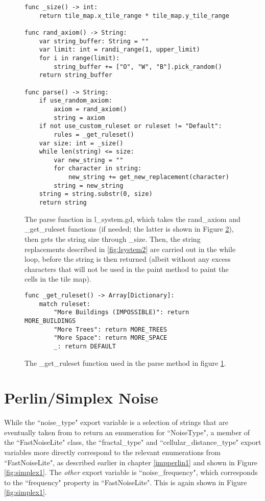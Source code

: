 \begin{figure}[H]
    \centering
    \begin{lstlisting}
func _size() -> int:
	return tile_map.x_tile_range * tile_map.y_tile_range

func rand_axiom() -> String:
	var string_buffer: String = ""
	var limit: int = randi_range(1, upper_limit)
	for i in range(limit):
		string_buffer += ["O", "W", "B"].pick_random()
	return string_buffer
 
func parse() -> String:
	if use_random_axiom:
		axiom = rand_axiom()
		string = axiom
	if not use_custom_ruleset or ruleset != "Default":
		rules = _get_ruleset()
	var size: int = _size()
	while len(string) <= size:
		var new_string = ""
		for character in string:
			new_string += get_new_replacement(character)
		string = new_string
	string = string.substr(0, size)
	return string
    \end{lstlisting}
    \caption{The parse function in l\_system.gd, which takes the rand\_axiom and \_get\_ruleset functions (if needed; the latter is shown in Figure \ref{fig:lsystem6}), then gets the string size through \_size. Then, the string replacements described in \ref{fig:lsystem2} are carried out in the while loop, before the string is then returned (albeit without any excess characters that will not be used in the paint method to paint the cells in the tile map).}
    \label{fig:lsystem5}
\end{figure}

\begin{figure}[H]
    \centering
    \begin{lstlisting}
func _get_ruleset() -> Array[Dictionary]:
	match ruleset:
		"More Buildings (IMPOSSIBLE)": return MORE_BUILDINGS
		"More Trees": return MORE_TREES
		"More Space": return MORE_SPACE
		_: return DEFAULT
    \end{lstlisting}
    \caption{The \_get\_ruleset function used in the parse method in figure \ref{fig:lsystem5}.}
    \label{fig:lsystem6}
\end{figure}

\section{Perlin/Simplex Noise} \label{impperlin2}

While the ``noise\_type" export variable is a selection of strings that are eventually taken from to return an enumeration for ``NoiseType", a member of the ``FastNoiseLite" class\cite{fastnoiselitedocs}, the ``fractal\_type" and ``cellular\_distance\_type" export variables more directly correspond to the relevant enumerations from ``FastNoiseLite", as described earlier in chapter \ref{impperlin1} and shown in Figure \ref{fig:simplex1}. The \textit{other} export variable is ``noise\_frequency", which corresponds to the ``frequency" property in ``FastNoiseLite". This is again shown in Figure \ref{fig:simplex1}.

